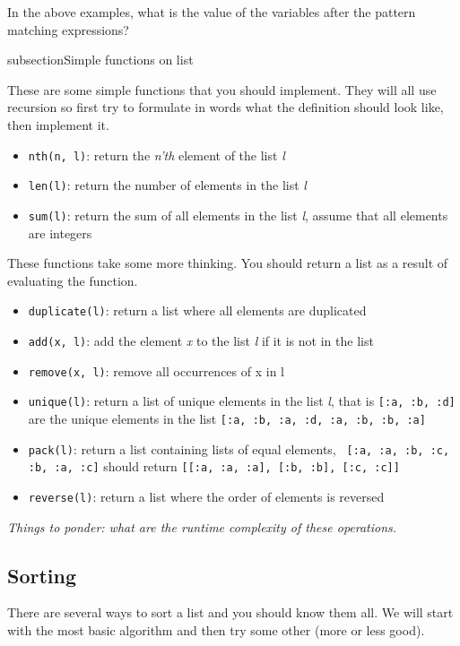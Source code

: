 \documentclass[a4paper,11pt]{article}
\begin{document}
In the above examples, what is the value of the variables after the
pattern matching expressions?

subsection{Simple functions on list}

These are some simple functions that you should implement. They will
all use recursion so first try to formulate in words what the
definition should look like, then implement it.

\begin{itemize}
\item {\tt nth(n, l)}: return the {\em n'th} element of the list {\em l}
\item {\tt len(l)}: return the number of elements in the list  {\em l}
\item {\tt sum(l)}: return the sum of all elements in the list  {\em l}, assume
  that all elements are integers
\end{itemize}

These functions take some more thinking. You should return a list as a
result of evaluating the function.

\begin{itemize}
\item {\tt duplicate(l)}: return a list where all elements are duplicated
\item {\tt add(x, l)}: add the element {\em x} to the list {\em l} if it is not in the list
\item {\tt remove(x, l)}: remove all occurrences of x in l 
\item {\tt unique(l)}: return a list of unique elements in the list {\em l},
  that is {\tt [:a, :b, :d]} are the unique elements in the list {\tt [:a, :b, :a, :d, :a, :b, :b, :a]}
\item {\tt pack(l)}: return a list containing lists of equal elements, {\tt
  [:a, :a, :b, :c, :b, :a, :c]} should return {\tt [[:a, :a, :a], [:b, :b], [:c, :c]]}
\item {\tt reverse(l)}: return a list where the order of elements is reversed
\end{itemize}

{\em Things to ponder: what are the runtime complexity of these operations.}

\subsection{Sorting}

There are several ways to sort a list and you should know them all. We
will start with the most basic algorithm and then try some other (more or less good).
\end{document}
